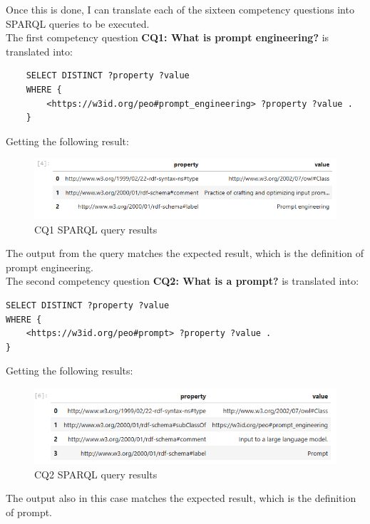Once this is done, I can translate each of the sixteen competency questions into SPARQL queries to be executed.\\
The first competency question \textbf{CQ1: What is prompt engineering?} is translated into:
\begin{lstlisting}
    SELECT DISTINCT ?property ?value
    WHERE {
        <https://w3id.org/peo#prompt_engineering> ?property ?value .
    }
\end{lstlisting}
Getting the following result:
\begin{figure}[H]
    \centering
    \includegraphics[width=0.9\linewidth]{Figures/fig_47.png}
    \caption{CQ1 SPARQL query results}
    \label{fig:enter-label}
\end{figure}
The output from the query matches the expected result, which is the definition of prompt engineering.\\

The second competency question \textbf{CQ2: What is a prompt?} is translated into:
\begin{lstlisting}
SELECT DISTINCT ?property ?value
WHERE {
    <https://w3id.org/peo#prompt> ?property ?value .
}
\end{lstlisting}
Getting the following results:
\begin{figure}[H]
    \centering
    \includegraphics[width=0.9\linewidth]{Figures/fig_48.png}
    \caption{CQ2 SPARQL query results}
    \label{fig:enter-label}
\end{figure}

The output also in this case matches the expected result, which is the definition of prompt.\\

